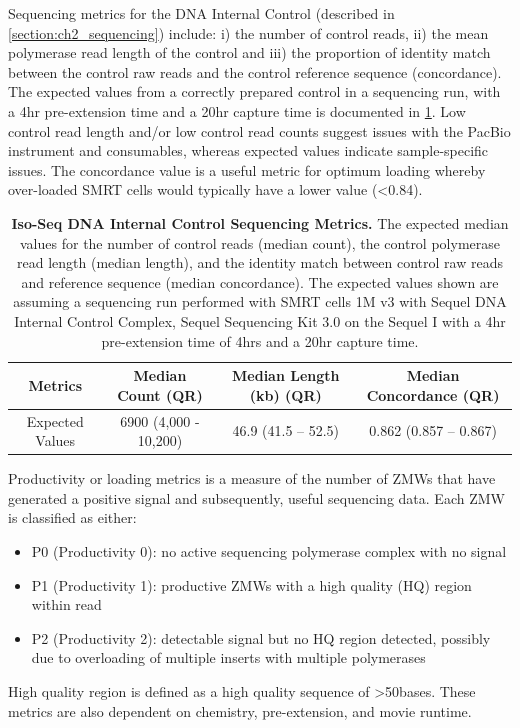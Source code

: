 Sequencing metrics for the DNA Internal Control (described in \cref{section:ch2_sequencing}) include: i) the number of control reads, ii) the mean polymerase read length of the control and iii) the proportion of identity match between the control raw reads and the control reference sequence (concordance). The expected values from a correctly prepared control in a sequencing run, with a 4hr pre-extension time and a 20hr capture time is documented in \cref{tab:control_Isoseqmetrics}. Low control read length and/or low control read counts suggest issues with the PacBio instrument and consumables, whereas expected values indicate sample-specific issues. The concordance value is a useful metric for optimum loading whereby over-loaded SMRT cells would typically have a lower value (<0.84).

\begin{table}[!h]
	\caption[Iso-Seq DNA Internal Control Sequencing Metrics]%
	{\textbf{Iso-Seq DNA Internal Control Sequencing Metrics.} The expected median values for the number of control reads (median count), the control polymerase read length (median length), and the identity match between control raw reads and reference sequence (median concordance). The expected values shown are assuming a sequencing run performed with SMRT cells 1M v3 with Sequel DNA Internal Control Complex, Sequel Sequencing Kit 3.0 on the Sequel I with a 4hr pre-extension time of 4hrs and a 20hr capture time.}
	\label{tab:control_Isoseqmetrics}
	
	\centering
	\begin{tabular}{@{}cccc@{}}
		\toprule
		Metrics         & Median Count (QR)     & Median Length (kb) (QR) & Median Concordance (QR) \\ \midrule
		Expected Values & 6900 (4,000 - 10,200) & 46.9 (41.5 – 52.5) & 0.862 (0.857 – 0.867)   \\ \bottomrule
	\end{tabular}
\end{table}


Productivity or loading metrics is a measure of the number of ZMWs that have generated a positive signal and subsequently, useful sequencing data. Each ZMW is classified as either: 
\begin{itemize}
	\item P0 (Productivity 0): no active sequencing polymerase complex with no signal 
	\item P1 (Productivity 1): productive ZMWs with a high quality (HQ) region within read 
	\item P2 (Productivity 2): detectable signal but no HQ region detected, possibly due to overloading of multiple inserts with multiple polymerases
\end{itemize}
High quality region is defined as a high quality sequence of >50bases. These metrics are also dependent on chemistry, pre-extension, and movie runtime.  

